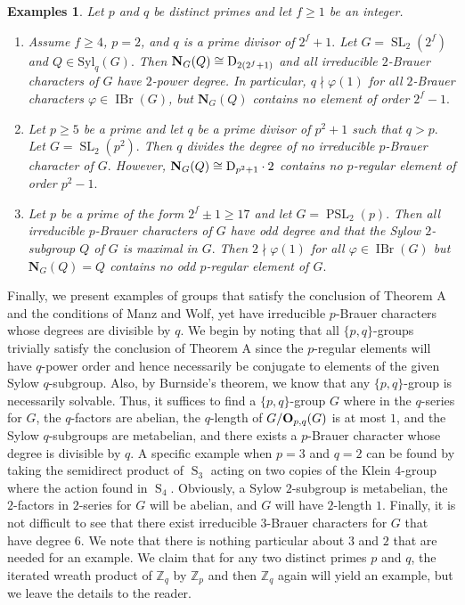 \documentclass[12pt]{amsart}
\newtheorem*{example}{Examples}
\theoremstyle{remark}
\numberwithin{equation}{section}
\begin{document}
\begin{example}
Let $p$ and $q$ be distinct primes and let $f\ge 1$ be an integer.
\begin{enumerate}
\item Assume $f\ge 4$, $p=2$, and $q$ is a prime divisor of $2^{f}+1.$ Let $G=\operatorname{SL}_2(2^f)$ and $Q\in{{\mathrm {Syl}}}_q(G).$ Then ${\mathbf{N}}_G(Q)\cong {\rm{D}}_{2(2^f+1)} $ and all irreducible $2$-Brauer characters of $G$ have $2$-power degree.  In particular, $q\nmid \varphi(1)$ for all $2$-Brauer characters $\varphi\in\operatorname{IBr}(G)$, but ${\mathbf{N}}_G(Q)$ contains no element of order $2^f-1.$

\item Let $p\ge 5$ be a prime and let $q$ be a prime divisor of $p^2+1$ such that $q>p.$ Let $G=\operatorname{SL}_2(p^2).$ Then $q$ divides the degree of no irreducible $p$-Brauer character of $G.$ However, ${\mathbf{N}}_G(Q)\cong {\rm{D}}_{p^2+1}\cdot 2$ contains no $p$-regular element of order $p^2-1.$

\item Let $p$ be a prime of the form $2^f\pm 1\ge 17$ and let $G=\operatorname{PSL}_2(p).$ Then all irreducible $p$-Brauer characters of $G$ have odd degree and that the Sylow $2$-subgroup $Q$ of $G$ is maximal in $G.$ Then $2\nmid \varphi(1)$ for all $\varphi\in\operatorname{IBr}(G)$ but ${\mathbf{N}}_G(Q)=Q$ contains no odd $p$-regular element of $G.$
\end{enumerate}
\end{example}

Finally, we present examples of groups that satisfy the conclusion of Theorem A and the conditions of Manz and Wolf, yet have irreducible $p$-Brauer characters whose degrees are divisible by $q$.  We begin by noting that all $\{ p, q \}$-groups trivially satisfy the conclusion of Theorem A since the $p$-regular elements will have $q$-power order and hence necessarily be conjugate to elements of the given Sylow $q$-subgroup.  Also, by Burnside's theorem, we know that any $\{ p, q \}$-group is necessarily solvable.  Thus, it suffices to find a $\{ p, q \}$-group $G$ where in the $q$-series for $G$, the $q$-factors are abelian, the $q$-length of $G/{\bf O}_{p,q} (G)$ is at most $1$, and the Sylow $q$-subgroups are metabelian, and there exists a $p$-Brauer character whose degree is divisible by $q$. A specific example when $p = 3$ and $q = 2$ can be found by taking the semidirect product of $\operatorname{S}_3$ acting on two copies of the Klein $4$-group where the action found in $\operatorname{S}_4$.  Obviously, a Sylow $2$-subgroup is metabelian, the $2$-factors in $2$-series for $G$ will be abelian, and $G$ will have $2$-length $1$.  Finally, it is not difficult to see that there exist irreducible $3$-Brauer characters for $G$ that have degree $6$.  We note that there is nothing particular about $3$ and $2$ that are needed for an example.  We claim that for any two distinct primes $p$ and $q$, the iterated wreath product of ${{\mathbb Z}}_q$ by ${{\mathbb Z}}_p$ and then ${{\mathbb Z}}_q$ again will yield an example, but we leave the details to the reader. 
\end{document}
